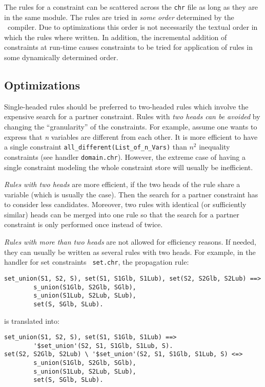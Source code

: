 The rules for a constraint can be scattered across the {\tt chr} file
as long as they are in the same module.
The rules are tried in {\em some order} determined by
the \chr\ compiler. Due to optimizations this order is not necessarily
the textual order in which the rules where written.  In addition, the
incremental addition of constraints at run-time causes constraints to
be tried for application of rules in some dynamically determined
order.

\subsection{Optimizations}

Single-headed rules should be preferred to two-headed rules which
involve the expensive search for a partner constraint.
Rules with {\em two heads can be avoided} by changing the ``granularity'' of
the constraints. For example, assume one wants to express that {\em n}
variables are different from each other.  It is more efficient to have
a single constraint {\tt all\_different(List\_of\_n\_Vars)} than
$n^2$
inequality constraints (see handler {\tt domain.chr}).  However, the
extreme case of having a single constraint modeling the whole
constraint store will usually be inefficient.

{\em Rules with two heads} are more efficient, if the two heads of the
rule share a variable (which is usually the case). Then the search for
a partner constraint has to consider less candidates.  Moreover, two
rules with identical (or sufficiently similar) heads can be merged
into one rule so that the search for a partner constraint is only
performed once instead of twice.

{\em Rules with more than two heads} are not allowed for efficiency
reasons.  If needed, they can usually be written as several rules with
two heads.  For example, in the handler for set constraints {\tt
set.chr}, the propagation rule:
\begin{verbatim}
set_union(S1, S2, S), set(S1, S1Glb, S1Lub), set(S2, S2Glb, S2Lub) ==>
        s_union(S1Glb, S2Glb, SGlb),
        s_union(S1Lub, S2Lub, SLub),
        set(S, SGlb, SLub).
\end{verbatim}
is translated into:
\begin{verbatim}
set_union(S1, S2, S), set(S1, S1Glb, S1Lub) ==>
        '$set_union'(S2, S1, S1Glb, S1Lub, S).
set(S2, S2Glb, S2Lub) \ '$set_union'(S2, S1, S1Glb, S1Lub, S) <=>
        s_union(S1Glb, S2Glb, SGlb),
        s_union(S1Lub, S2Lub, SLub),
        set(S, SGlb, SLub).
\end{verbatim}

